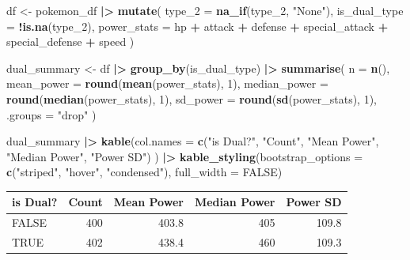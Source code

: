 \documentclass[
]{article}
\newenvironment{Shaded}{\begin{snugshade}}{\end{snugshade}}
\newcommand{\AttributeTok}[1]{\textcolor[rgb]{0.13,0.29,0.53}{#1}}
\newcommand{\ConstantTok}[1]{\textcolor[rgb]{0.56,0.35,0.01}{#1}}
\newcommand{\DecValTok}[1]{\textcolor[rgb]{0.00,0.00,0.81}{#1}}
\newcommand{\FunctionTok}[1]{\textcolor[rgb]{0.13,0.29,0.53}{\textbf{#1}}}
\newcommand{\NormalTok}[1]{#1}
\newcommand{\OtherTok}[1]{\textcolor[rgb]{0.56,0.35,0.01}{#1}}
\newcommand{\SpecialCharTok}[1]{\textcolor[rgb]{0.81,0.36,0.00}{\textbf{#1}}}
\newcommand{\StringTok}[1]{\textcolor[rgb]{0.31,0.60,0.02}{#1}}
\begin{document}
\begin{Shaded}
\begin{Highlighting}[]
\NormalTok{df }\OtherTok{\textless{}{-}}\NormalTok{ pokemon\_df }\SpecialCharTok{|\textgreater{}}
  \FunctionTok{mutate}\NormalTok{(}
    \AttributeTok{type\_2       =} \FunctionTok{na\_if}\NormalTok{(type\_2, }\StringTok{"None"}\NormalTok{),}
    \AttributeTok{is\_dual\_type =} \SpecialCharTok{!}\FunctionTok{is.na}\NormalTok{(type\_2),}
    \AttributeTok{power\_stats  =}\NormalTok{ hp }\SpecialCharTok{+}\NormalTok{ attack }\SpecialCharTok{+}\NormalTok{ defense }\SpecialCharTok{+}\NormalTok{ special\_attack }\SpecialCharTok{+}\NormalTok{ special\_defense }\SpecialCharTok{+}\NormalTok{ speed}
\NormalTok{  )}

\NormalTok{dual\_summary }\OtherTok{\textless{}{-}}\NormalTok{ df }\SpecialCharTok{|\textgreater{}}
  \FunctionTok{group\_by}\NormalTok{(is\_dual\_type) }\SpecialCharTok{|\textgreater{}}
  \FunctionTok{summarise}\NormalTok{(}
    \AttributeTok{n            =} \FunctionTok{n}\NormalTok{(),}
    \AttributeTok{mean\_power   =} \FunctionTok{round}\NormalTok{(}\FunctionTok{mean}\NormalTok{(power\_stats), }\DecValTok{1}\NormalTok{),}
    \AttributeTok{median\_power =} \FunctionTok{round}\NormalTok{(}\FunctionTok{median}\NormalTok{(power\_stats), }\DecValTok{1}\NormalTok{),}
    \AttributeTok{sd\_power     =} \FunctionTok{round}\NormalTok{(}\FunctionTok{sd}\NormalTok{(power\_stats), }\DecValTok{1}\NormalTok{),}
    \AttributeTok{.groups =} \StringTok{"drop"}
\NormalTok{  )}

\NormalTok{dual\_summary }\SpecialCharTok{|\textgreater{}}
  \FunctionTok{kable}\NormalTok{(}\AttributeTok{col.names =} \FunctionTok{c}\NormalTok{(}\StringTok{"is Dual?"}\NormalTok{, }\StringTok{"Count"}\NormalTok{, }\StringTok{"Mean Power"}\NormalTok{, }\StringTok{"Median Power"}\NormalTok{, }\StringTok{"Power SD"}\NormalTok{)}
\NormalTok{  ) }\SpecialCharTok{|\textgreater{}}
  \FunctionTok{kable\_styling}\NormalTok{(}\AttributeTok{bootstrap\_options =} \FunctionTok{c}\NormalTok{(}\StringTok{"striped"}\NormalTok{, }\StringTok{"hover"}\NormalTok{, }\StringTok{"condensed"}\NormalTok{),}
                \AttributeTok{full\_width =} \ConstantTok{FALSE}\NormalTok{)}
\end{Highlighting}
\end{Shaded}

\begin{longtable}[t]{lrrrr}
\toprule
is Dual? & Count & Mean Power & Median Power & Power SD\\
\midrule
FALSE & 400 & 403.8 & 405 & 109.8\\
TRUE & 402 & 438.4 & 460 & 109.3\\
\bottomrule
\end{longtable}
\end{document}
